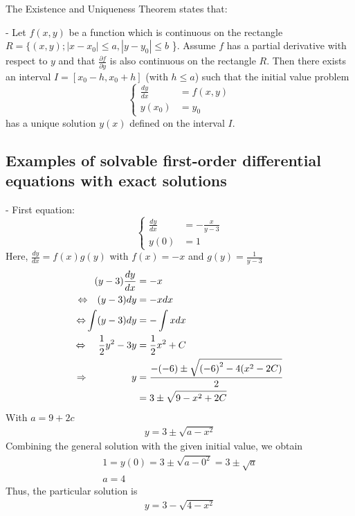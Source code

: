 \documentclass[a4paper]{article}
\begin{document}
The Existence and Uniqueness Theorem states that:

- Let \(f(x,y)\) be a function which is continuous on the rectangle  \(R = \{(x, y); |x - x_0| \leq a, |y - y_0| \leq b\) \}.
Assume \(f\) has a partial derivative with respect to \(y\) and that \(\frac{\partial f}{\partial y}\) is also continuous on the rectangle \(R\).
Then there exists an interval \(I=[x_0-h, x_0+h]\) (with \(h \leq a\)) such that the initial value problem
\begin{equation*}
  \begin{cases}
    \frac{dy}{dx} & = f(x,y) \\
    y(x_0)        & = y_0
  \end{cases}
\end{equation*}
has a unique solution \(y(x)\) defined on the interval \(I\).


\subsection{Examples of solvable first-order differential equations with exact solutions}
- First equation:
\begin{equation*}
  \begin{cases}
    \frac{dy}{dx} & = - \frac{x}{y - 3} \\
    y(0)          & = 1
  \end{cases}
\end{equation*}
Here, \(\frac{dy}{dx} = f(x)g(y)\) with \(f(x) = -x\) and \(g(y) = \frac{1}{y-3}\)
\begin{align*}
  (y - 3) \frac{dy}{dx}                                     & = -x                                                \\
  {\color{black}\Leftrightarrow} ~~~ (y - 3) dy             & = -x dx                                             \\
  {\color{black}\Leftrightarrow}  \int (y - 3) dy           & = -\int xdx                                         \\
  {\color{black}\Leftrightarrow} ~~~~ \frac {1}{2} y^2 - 3y & = \frac{1}{2} x^2 + C                               \\
  {\color{black}\Rightarrow} ~~~~~~~~~~~~~~ y               & = \frac{-(-6) \pm \sqrt{{(-6)}^2 - 4(x^2 - 2C)}}{2} \\
                                                            & = 3 \pm \sqrt{9 - x^2 + 2C}
\end{align*}
With \(a = 9 + 2c\)
\begin{gather*}
  y = 3 \pm \sqrt{a - x^2}
\end{gather*}
Combining the general solution with the given initial value, we obtain
\begin{gather*}
  1 = y(0) = 3 \pm \sqrt{a - 0^2} = 3 \pm \sqrt{a} \\
  a = 4
\end{gather*}
Thus, the particular solution is
\begin{gather*}
  y = 3 - \sqrt{4-x^2}
\end{gather*} \\
\end{document}

